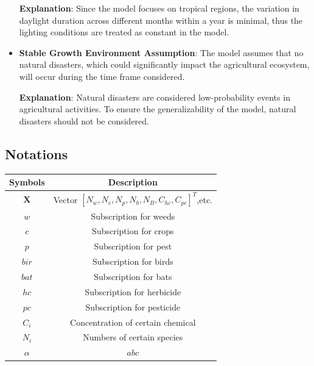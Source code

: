 \documentclass{HZNUMCM}
\begin{document}
\begin{itemize}
        \textbf{Explanation}: Since the model focuses on tropical regions, the variation in daylight duration across different months within a year is minimal, thus the lighting conditions are treated as constant in the model.
        \item \textbf{Stable Growth Environment Assumption}: The model assumes that no natural disasters, which could significantly impact the agricultural ecosystem, will occur during the time frame considered.
  
        \textbf{Explanation}: Natural disasters are considered low-probability events in agricultural activities. To ensure the generalizability of the model, natural disasters should not be considered.
      \end{itemize}
        \subsection{Notations}
      \begin{table}[h]
        \centering
        \begin{tabular}{cc}
          \toprule
          \rowcolor{customcolor!40} %
          Symbols & Description\\
          \midrule
          $\mathbf{X}$ & Vector $[N_w,N_c,N_p,N_b,N_B,C_{hc},C_{pc}]^T$,etc. \\
          $w$ & Subscription for weeds \\
          $c$ & Subscription for crops \\
          $p$ & Subscription for pest \\
          $bir$ & Subscription for birds \\
          $bat$ & Subscription for bats \\
          $hc$ & Subscription for herbicide \\
          $pc$ & Subscription for pesticide \\
          $C_i$ & Concentration of certain chemical \\
          $N_i$ & Numbers of certain species \\
          $\alpha$ & $abc$ \\
          \bottomrule
        \end{tabular}
        \label{tab:example}
      \end{table}
\end{document}
